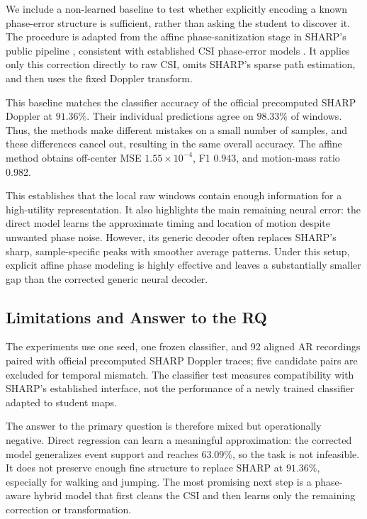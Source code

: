 We include a non-learned baseline to test whether explicitly encoding a known
phase-error structure is sufficient, rather than asking the student to discover
it. The procedure is adapted from the affine phase-sanitization stage in
SHARP's public pipeline \cite{meneghello2023sharp}, consistent with established
CSI phase-error models \cite{ratnam2024optimal}. It applies only this correction
directly to raw CSI, omits SHARP's sparse path estimation, and then uses the
fixed Doppler transform.

This baseline matches the classifier accuracy of the official precomputed
SHARP Doppler at \(91.36\%\). Their individual predictions agree on \(98.33\%\) of
windows. Thus, the methods make different mistakes on a small number of samples, and these differences cancel out, resulting in the same overall accuracy. The affine
method obtains off-center MSE \(1.55\times10^{-4}\), F1 \(0.943\), and
motion-mass ratio 0.982.

This establishes that the local raw windows contain enough information for a
high-utility representation. It also highlights the main remaining neural error:
the direct model learns the approximate timing and location of motion despite unwanted phase noise. However, its generic decoder often replaces SHARP’s sharp, sample-specific peaks with smoother average patterns.
Under this setup, explicit affine phase modeling is highly effective and leaves
a substantially smaller gap than the corrected generic neural decoder.

\subsection{Limitations and Answer to the RQ}

The experiments use one seed, one frozen classifier, and 92 aligned AR
recordings paired with official precomputed SHARP Doppler traces; five candidate pairs are
excluded for temporal mismatch. The classifier test measures compatibility
with SHARP's established interface, not
the performance of a newly trained classifier adapted to student maps. 

The answer to the primary question is therefore mixed but operationally
negative. Direct regression can learn a meaningful approximation: the corrected
model generalizes event support and reaches \(63.09\%\), so the task is not
infeasible. It does not preserve enough fine structure to replace SHARP at
\(91.36\%\), especially for walking and jumping. The most promising next step is a phase-aware hybrid model that first cleans the CSI and then learns only the remaining correction or transformation.
